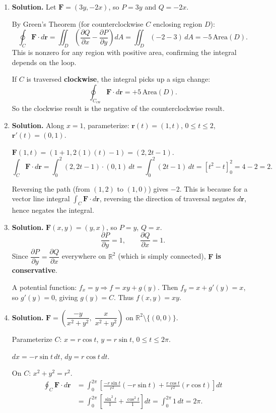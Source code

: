 \begin{enumerate}
\item \textbf{Solution.}
Let $\mathbf{F} = (3y, -2x)$, so $P=3y$ and $Q=-2x$.

By Green's Theorem (for counterclockwise $C$ enclosing region $D$):
\[
\oint_C \mathbf{F}\cdot d\mathbf{r} = \iint_D\left(\frac{\partial Q}{\partial x} - \frac{\partial P}{\partial y}\right)dA = \iint_D(-2-3)\,dA = -5\,\text{Area}(D).
\]
This is nonzero for any region with positive area, confirming the integral depends on the loop.

If $C$ is traversed \textbf{clockwise}, the integral picks up a sign change:
\[
\oint_{C_{\text{cw}}} \mathbf{F}\cdot d\mathbf{r} = +5\,\text{Area}(D).
\]
So the clockwise result is the negative of the counterclockwise result.

\item \textbf{Solution.}
Along $x=1$, parameterize: $\mathbf{r}(t) = (1,t)$, $0\le t\le 2$, $\mathbf{r}'(t)=(0,1)$.

$\mathbf{F}(1,t) = (1+1, 2(1)(t)-1) = (2, 2t-1)$.
\[
\int_C \mathbf{F}\cdot d\mathbf{r} = \int_0^2 (2,2t-1)\cdot(0,1)\,dt = \int_0^2(2t-1)\,dt = \left[t^2-t\right]_0^2 = 4-2 = \boxed{2}.
\]

Reversing the path (from $(1,2)$ to $(1,0)$) gives $-2$. This is because for a vector line integral $\int_C \mathbf{F}\cdot d\mathbf{r}$, reversing the direction of traversal negates $d\mathbf{r}$, hence negates the integral.

\item \textbf{Solution.}
$\mathbf{F}(x,y) = (y,x)$, so $P=y$, $Q=x$.
\[
\frac{\partial P}{\partial y} = 1, \qquad \frac{\partial Q}{\partial x} = 1.
\]
Since $\dfrac{\partial P}{\partial y} = \dfrac{\partial Q}{\partial x}$ everywhere on $\mathbb{R}^2$ (which is simply connected), $\mathbf{F}$ \textbf{is conservative}.

A potential function: $f_x = y \Rightarrow f = xy + g(y)$. Then $f_y = x + g'(y) = x$, so $g'(y)=0$, giving $g(y)=C$. Thus $f(x,y)=xy$.

\item \textbf{Solution.}
$\mathbf{F} = \left(\dfrac{-y}{x^2+y^2},\;\dfrac{x}{x^2+y^2}\right)$ on $\mathbb{R}^2\setminus\{(0,0)\}$.

Parameterize $C$: $x = r\cos t$, $y = r\sin t$, $0\le t\le 2\pi$.

$dx = -r\sin t\,dt$, $dy = r\cos t\,dt$.

On $C$: $x^2+y^2 = r^2$.
\begin{align*}
\oint_C \mathbf{F}\cdot d\mathbf{r} &= \int_0^{2\pi}\left[\frac{-r\sin t}{r^2}(-r\sin t) + \frac{r\cos t}{r^2}(r\cos t)\right]dt \\
&= \int_0^{2\pi}\left[\frac{\sin^2 t}{1} + \frac{\cos^2 t}{1}\right]dt = \int_0^{2\pi}1\,dt = \boxed{2\pi}.
\end{align*}


\end{enumerate}
